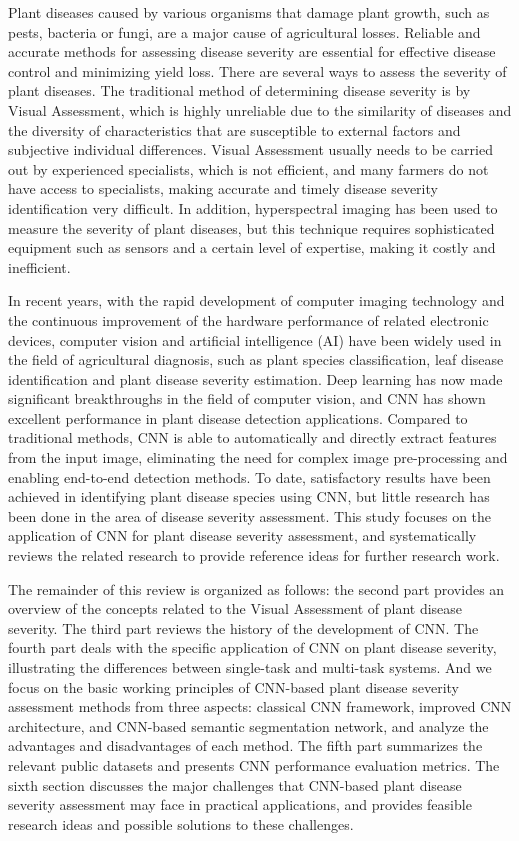 Plant diseases caused by various organisms that damage plant growth, such as pests, bacteria or fungi, are a major cause of agricultural losses. Reliable and accurate methods for assessing disease severity are essential for effective disease control and minimizing yield loss. There are several ways to assess the severity of plant diseases. The traditional method of determining disease severity is by Visual Assessment, which is highly unreliable due to the similarity of diseases and the diversity of characteristics that are susceptible to external factors and subjective individual differences. Visual Assessment usually needs to be carried out by experienced specialists, which is not efficient, and many farmers do not have access to specialists, making accurate and timely disease severity identification very difficult. In addition, hyperspectral imaging has been used to measure the severity of plant diseases, but this technique requires sophisticated equipment such as sensors and a certain level of expertise, making it costly and inefficient.

In recent years, with the rapid development of computer imaging technology and the continuous improvement of the hardware performance of related electronic devices, computer vision and artificial intelligence (AI) have been widely used in the field of agricultural diagnosis, such as plant species classification, leaf disease identification and plant disease severity estimation. Deep learning has now made significant breakthroughs in the field of computer vision, and CNN has shown excellent performance in plant disease detection applications. Compared to traditional methods, CNN is able to automatically and directly extract features from the input image, eliminating the need for complex image pre-processing and enabling end-to-end detection methods. To date, satisfactory results have been achieved in identifying plant disease species using CNN, but little research has been done in the area of disease severity assessment. This study focuses on the application of CNN for plant disease severity assessment, and systematically reviews the related research to provide reference ideas for further research work.

The remainder of this review is organized as follows: the second part provides an overview of the concepts related to the Visual Assessment of plant disease severity. The third part reviews the history of the development of CNN. The fourth part deals with the specific application of CNN on plant disease severity, illustrating the differences between single-task and multi-task systems. And we focus on the basic working principles of CNN-based plant disease severity assessment methods from three aspects: classical CNN framework, improved CNN architecture, and CNN-based semantic segmentation network, and analyze the advantages and disadvantages of each method. The fifth part summarizes the relevant public datasets and presents CNN performance evaluation metrics. The sixth section discusses the major challenges that CNN-based plant disease severity assessment may face in practical applications, and provides feasible research ideas and possible solutions to these challenges.

